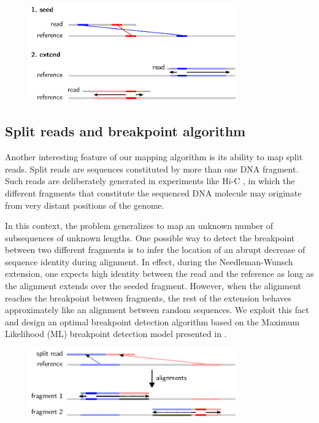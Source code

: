 \begin{figure}[h]
	\begin{minipage}[b]{\linewidth}
	  \centering
	  \includegraphics[width=0.8\textwidth]{figures/chap3_seedandextend}
	  \caption{}
	  \label{fig:chap3:modelneighborhood}
   \end{minipage}
\end{figure}


\subsection{Split reads and breakpoint algorithm}
Another interesting feature of our mapping algorithm is its ability to
map split reads. Split reads are sequences constituted by more
than one DNA fragment. Such reads are deliberately generated in
experiments like Hi-C \cite{}, in which the different fragments that
constitute the sequenced DNA molecule may originate from very distant
positions of the genome.

In this context, the problem generalizes to map an unknown number of
subsequences of unknown lengths. One possible way to detect the
breakpoint between two different fragments is to infer the location of
an abrupt decrease of sequence identity during alignment. In effect,
during the Needleman-Wunsch extension, one expects high identity
between the read and the reference as long as the alignment extends
over the seeded fragment. However, when the alignment reaches the
breakpoint between fragments, the rest of the extension behaves
approximately like an alignment between random sequences. We exploit
this fact and design an optimal breakpoint detection algorithm based
on the Maximum Likelihood (ML) breakpoint detection model presented in
\cite{breakpoint}. 

\begin{figure}[h]
	\begin{minipage}[b]{\linewidth}
	  \centering
	  \includegraphics[width=0.8\textwidth]{figures/chap3_splitread}
	  \caption{}
	  \label{fig:chap3:modelneighborhood}
   \end{minipage}
\end{figure}

